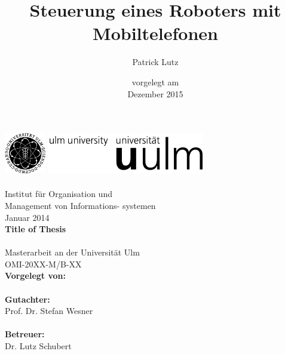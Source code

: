 \documentclass[BCOR20mm,DIV14,twoside,10pt,headinclude,footexclude,bibtotoc,liststotoc]{scrbook}
\title{Steuerung eines Roboters mit Mobiltelefonen} \let\thetitle\@title
\author{Patrick Lutz} \let\theauthor\@author
\date{
\footnotesize vorgelegt am\\
\normalsize Dezember 2015
}
\begin{document}
\frontmatter %
\thispagestyle{empty}

\newlength{\backup}
\setlength{\backup}{\headheight}

\includegraphics[height=1.8cm]{images/logo_100_sw_bildmarke}
\hfill
\includegraphics[height=1.8cm]{images/logo_100_sw_wortmarke}\\[1em]

{\footnotesize
{}\\
\hspace*{10.85cm}Institut für Organisation und\\
\hspace*{10.85cm}Management von Informations-
\hspace*{10.85cm}systemen\\[1em]
\hspace*{10.85cm}Januar 2014\\[6em]
}
{\bfseries \huge Title of Thesis\\
}\\[0.5em]
{\large Masterarbeit an der Universität Ulm}\\[1em]
OMI-20XX-M/B-XX\\[4em]


{\large \bfseries Vorgelegt von:}\\                     
\theauthor \\[2em]
{\large \bfseries Gutachter:}\\                     
Prof. Dr. Stefan Wesner\\
\\[2em]
{\large \bfseries Betreuer:}\\ 
Dr. Lutz Schubert\\
\end{document}
